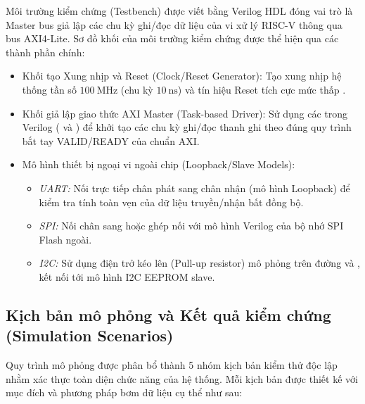 Môi trường kiểm chứng (Testbench) được viết bằng Verilog HDL đóng vai trò là Master bus giả lập các chu kỳ ghi/đọc dữ liệu của vi xử lý RISC-V thông qua bus AXI4-Lite. Sơ đồ khối của môi trường kiểm chứng được thể hiện qua các thành phần chính:
\begin{itemize}
    \item {Khối tạo Xung nhịp và Reset (Clock/Reset Generator):} Tạo xung nhịp hệ thống  tần số $100~\text{MHz}$ (chu kỳ $10~\text{ns}$) và tín hiệu Reset tích cực mức thấp .
    \item {Khối giả lập giao thức AXI Master (Task-based Driver):} Sử dụng các  trong Verilog ( và ) để khởi tạo các chu kỳ ghi/đọc thanh ghi theo đúng quy trình bắt tay VALID/READY của chuẩn AXI.
    \item {Mô hình thiết bị ngoại vi ngoài chip (Loopback/Slave Models):}
    \begin{itemize}
        \item \textit{UART:} Nối trực tiếp chân phát  sang chân nhận  (mô hình Loopback) để kiểm tra tính toàn vẹn của dữ liệu truyền/nhận bất đồng bộ.
        \item \textit{SPI:} Nối chân  sang  hoặc ghép nối với mô hình Verilog của bộ nhớ SPI Flash ngoài.
        \item \textit{I2C:} Sử dụng điện trở kéo lên (Pull-up resistor) mô phỏng trên đường  và , kết nối tới mô hình I2C EEPROM slave.
    \end{itemize}
\end{itemize}

\subsection{Kịch bản mô phỏng và Kết quả kiểm chứng (Simulation Scenarios)}

Quy trình mô phỏng được phân bổ thành 5 nhóm kịch bản kiểm thử độc lập nhằm xác thực toàn diện chức năng của hệ thống. Mỗi kịch bản được thiết kế với mục đích và phương pháp bơm dữ liệu cụ thể như sau:

